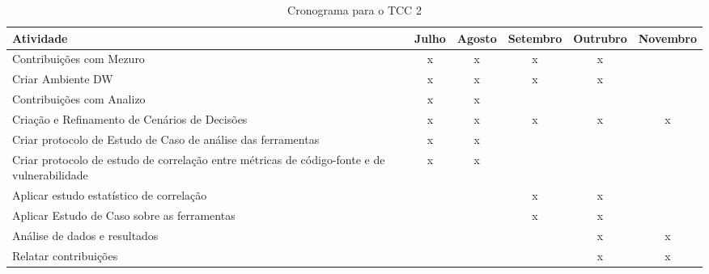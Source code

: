 	\begin{table}[H]
	\begin{center}
	    \begin{tabular}{ | p{5cm} | c | c |  c |  c |  c |}
	    \hline
	    Atividade & Julho & Agosto & Setembro & Outrubro & Novembro \\ \hline
	    Contribuições com Mezuro & x & x & x & x &  \\ \hline
	    Criar Ambiente DW & x & x & x & x & \\ \hline
	    Contribuições com Analizo & x & x &  &  & \\ \hline
	    Criação e Refinamento de Cenários de Decisões & x & x & x & x & x\\ \hline
	    Criar protocolo de Estudo de Caso de análise das ferramentas & x & x &  &  & \\ \hline
	    Criar protocolo de estudo de correlação entre métricas de código-fonte e de vulnerabilidade & x & x &  &  & \\ \hline
	    Aplicar estudo estatístico de correlação &  &  & x & x & \\ \hline
	    Aplicar Estudo de Caso sobre as ferramentas &  &  & x & x & \\ \hline
	    Análise de dados e resultados &  &  &  & x & x\\ \hline
	    Relatar contribuições &  &  &  & x & x\\ \hline
	    \end{tabular}
	    \caption{Cronograma para o TCC 2}
	    \label{tab:cronograma}
	\end{center}
	\end{table}
